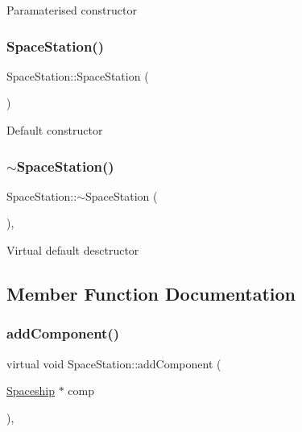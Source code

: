 Paramaterised constructor \mbox{\label{classSpaceStation_ab8582f38baf13f990b87cf42d7c2293c}} 
\subsubsection{\texorpdfstring{Space\+Station()}{SpaceStation()}\hspace{0.1cm}{\footnotesize\ttfamily [2/2]}}
{\footnotesize\ttfamily Space\+Station\+::\+Space\+Station (\begin{DoxyParamCaption}{ }\end{DoxyParamCaption})\hspace{0.3cm}{\ttfamily [protected]}}

Default constructor \mbox{\label{classSpaceStation_ab14cf2bd79032be8342f6475911bd64b}} 
\subsubsection{\texorpdfstring{$\sim$\+Space\+Station()}{~SpaceStation()}}
{\footnotesize\ttfamily Space\+Station\+::$\sim$\+Space\+Station (\begin{DoxyParamCaption}{ }\end{DoxyParamCaption})\hspace{0.3cm}{\ttfamily [protected]}, {\ttfamily [virtual]}}

Virtual default desctructor 

\subsection{Member Function Documentation}
\mbox{\label{classSpaceStation_ae89449fdcf5d44229fb93a14fc496fe1}} 
\subsubsection{\texorpdfstring{add\+Component()}{addComponent()}}
{\footnotesize\ttfamily virtual void Space\+Station\+::add\+Component (\begin{DoxyParamCaption}\item[{\hyperlink{classSpaceship}{Spaceship} $\ast$}]{comp }\end{DoxyParamCaption})\hspace{0.3cm}{\ttfamily [inline]}, {\ttfamily [virtual]}}

